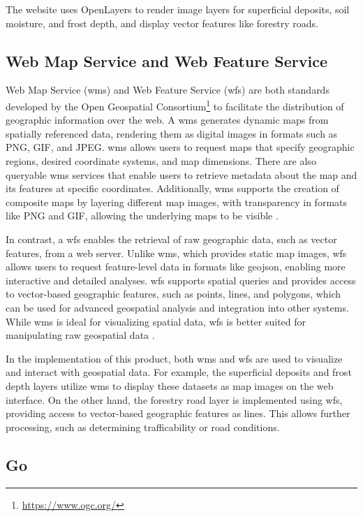 The website uses OpenLayers to render image layers for \gls{superficial deposit}s, soil moisture, and \gls{frost} depth, and display vector features like forestry roads.  

\subsection{Web Map Service and Web Feature Service}

Web Map Service (\Gls{wms}) and Web Feature Service (\Gls{wfs}) are both standards developed by the Open Geospatial Consortium\footnote{\url{https://www.ogc.org/}} to facilitate the distribution of geographic information over the web. A \Gls{wms} generates dynamic maps from spatially referenced data, rendering them as digital images in formats such as PNG, GIF, and JPEG. \Gls{wms} allows users to request maps that specify geographic regions, desired coordinate systems, and map dimensions. There are also queryable \Gls{wms} services that enable users to retrieve metadata about the map and its features at specific coordinates. Additionally, \Gls{wms} supports the creation of composite maps by layering different map images, with transparency in formats like PNG and GIF, allowing the underlying maps to be visible \cite{ogc2006wms}.

In contrast, a \Gls{wfs} enables the retrieval of raw geographic data, such as vector features, from a web server. Unlike \Gls{wms}, which provides static map images, \Gls{wfs} allows users to request feature-level data in formats like \Gls{geojson}, enabling more interactive and detailed analyses. \Gls{wfs} supports spatial queries and provides access to vector-based geographic features, such as points, lines, and polygons, which can be used for advanced geospatial analysis and integration into other systems. While \Gls{wms} is ideal for visualizing spatial data, \Gls{wfs} is better suited for manipulating raw geospatial data \cite{ogc2005wfs}.

In the implementation of this product, both \Gls{wms} and \Gls{wfs} are used to visualize and interact with geospatial data. For example, the superficial deposits and frost depth layers utilize \Gls{wms} to display these datasets as map images on the web interface. On the other hand, the forestry road layer is implemented using \Gls{wfs}, providing access to vector-based geographic features as lines. This allows further processing, such as determining \gls{trafficability} or road conditions.

\subsection{Go}\label{subsec:implementation:technologies:go}

